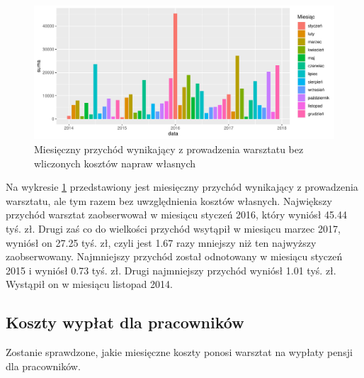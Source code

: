 \documentclass{article}\usepackage[]{graphicx}\usepackage[]{xcolor}
\makeatletter
\def\maxwidth{ %
  \ifdim\Gin@nat@width>\linewidth
    \linewidth
  \else
    \Gin@nat@width
  \fi
}
\newenvironment{knitrout}{}{} %
\makeatother
\begin{document}
\begin{knitrout}
\color{fgcolor}\begin{figure}[H]

{\centering \includegraphics[width=\maxwidth]{figure/fig_uslugi2-1} 

}

\caption[Miesięczny przychód wynikający z prowadzenia warsztatu bez wliczonych kosztów napraw własnych]{Miesięczny przychód wynikający z prowadzenia warsztatu bez wliczonych kosztów napraw własnych}\label{fig:fig_uslugi2}
\end{figure}

\end{knitrout}

Na wykresie \ref{fig:fig_uslugi2} przedstawiony jest miesięczny przychód wynikający z prowadzenia warsztatu, ale tym razem bez uwzględnienia kosztów własnych. 
Największy przychód warsztat zaobserwował w miesiącu styczeń 2016, który wyniósł 45.44 tyś. zł.
Drugi zaś co do wielkości przychód wsytąpił w miesiącu marzec 2017, wyniósł on 27.25 tyś. zł, czyli jest 1.67 razy mniejszy niż ten najwyższy zaobserwowany.
Najmniejszy przychód został odnotowany w miesiącu styczeń 2015 i wyniósł 0.73 tyś. zł. 
Drugi najmniejszy przychód wyniósł 1.01 tyś. zł. Wystąpił on w miesiącu listopad 2014.

\subsection{Koszty wypłat dla pracowników}

Zostanie sprawdzone, jakie miesięczne koszty ponosi warsztat na wypłaty pensji dla pracowników.

\end{document}
